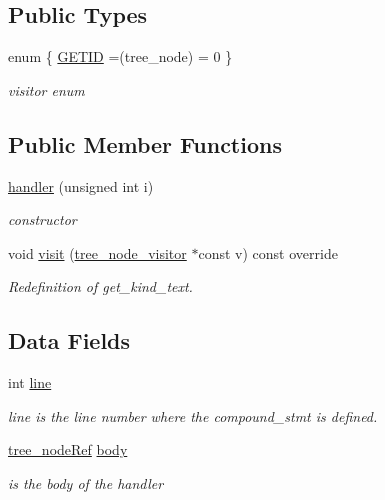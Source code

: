 \subsection*{Public Types}
\begin{DoxyCompactItemize}
\item 
enum \{ \hyperlink{structhandler_a0564a1d2bd04a6cb6212aa5dc7e07be0af00e527c188bd59321c377c3f5b56fc4}{G\+E\+T\+ID} =(tree\+\_\+node) = 0
 \}\begin{DoxyCompactList}\small\item\em visitor enum \end{DoxyCompactList}
\end{DoxyCompactItemize}
\subsection*{Public Member Functions}
\begin{DoxyCompactItemize}
\item 
\hyperlink{structhandler_af07eae7d35241a2bc85d8e366e356652}{handler} (unsigned int i)
\begin{DoxyCompactList}\small\item\em constructor \end{DoxyCompactList}\item 
void \hyperlink{structhandler_a59a457d67ccce8a01c0025929abba5a1}{visit} (\hyperlink{classtree__node__visitor}{tree\+\_\+node\+\_\+visitor} $\ast$const v) const override
\begin{DoxyCompactList}\small\item\em Redefinition of get\+\_\+kind\+\_\+text. \end{DoxyCompactList}\end{DoxyCompactItemize}
\subsection*{Data Fields}
\begin{DoxyCompactItemize}
\item 
int \hyperlink{structhandler_aac4431e50650691272924915662146c3}{line}
\begin{DoxyCompactList}\small\item\em line is the line number where the compound\+\_\+stmt is defined. \end{DoxyCompactList}\item 
\hyperlink{tree__node_8hpp_a6ee377554d1c4871ad66a337eaa67fd5}{tree\+\_\+node\+Ref} \hyperlink{structhandler_a00ed2efee98a03945bea7528b70b9160}{body}
\begin{DoxyCompactList}\small\item\em is the body of the handler \end{DoxyCompactList}\end{DoxyCompactItemize}
